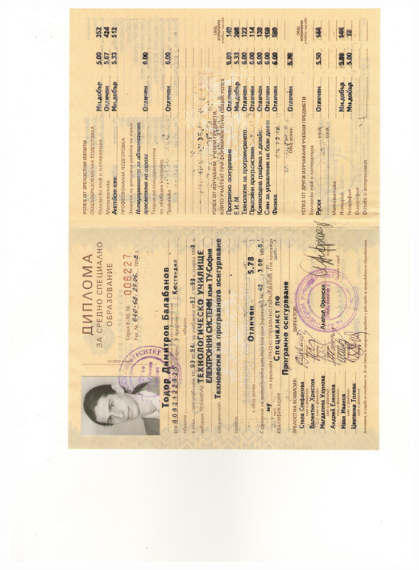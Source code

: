 \documentclass[bulgarian,a4paper]{europasscv}
\begin{document}
\includegraphics[width=\textwidth,height=\textheight,keepaspectratio]{DiplomaTUES1998_1}
\end{document}
